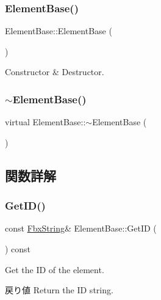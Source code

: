 \subsubsection{\texorpdfstring{Element\+Base()}{ElementBase()}}
{\footnotesize\ttfamily Element\+Base\+::\+Element\+Base (\begin{DoxyParamCaption}{ }\end{DoxyParamCaption})}

Constructor \& Destructor. \mbox{\label{class_element_base_a564b84810083ca6558d00c331bd9eccd}} 
\subsubsection{\texorpdfstring{$\sim$\+Element\+Base()}{~ElementBase()}}
{\footnotesize\ttfamily virtual Element\+Base\+::$\sim$\+Element\+Base (\begin{DoxyParamCaption}{ }\end{DoxyParamCaption})\hspace{0.3cm}{\ttfamily [virtual]}}



\subsection{関数詳解}
\mbox{\label{class_element_base_a9a8bf10158b3028d050f17d357be5ebb}} 
\subsubsection{\texorpdfstring{Get\+I\+D()}{GetID()}}
{\footnotesize\ttfamily const \hyperlink{class_fbx_string}{Fbx\+String}\& Element\+Base\+::\+Get\+ID (\begin{DoxyParamCaption}{ }\end{DoxyParamCaption}) const}

Get the ID of the element. \begin{DoxyReturn}{戻り値}
Return the ID string. 
\end{DoxyReturn}
\mbox{\label{class_element_base_a1449309f004525a5c009d1fb7d3cb60c}} 
